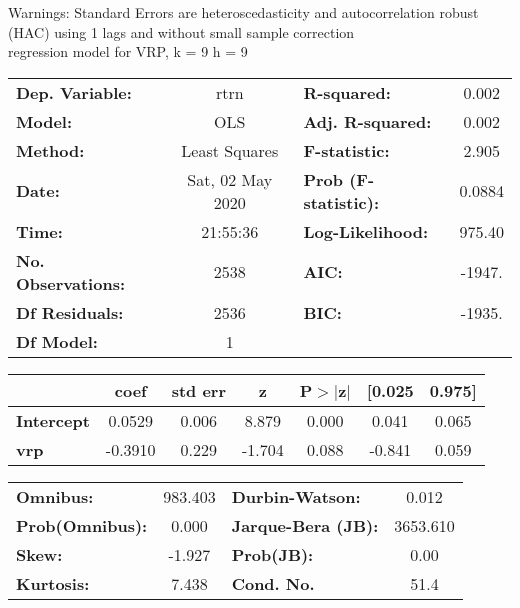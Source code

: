 Warnings: \newline
 [1] Standard Errors are heteroscedasticity and autocorrelation robust (HAC) using 1 lags and without small sample correction\\ 

regression model for VRP, k = 9 h = 9\begin{center}
\begin{tabular}{lclc}
\toprule
\textbf{Dep. Variable:}    &       rtrn       & \textbf{  R-squared:         } &     0.002   \\
\textbf{Model:}            &       OLS        & \textbf{  Adj. R-squared:    } &     0.002   \\
\textbf{Method:}           &  Least Squares   & \textbf{  F-statistic:       } &     2.905   \\
\textbf{Date:}             & Sat, 02 May 2020 & \textbf{  Prob (F-statistic):} &   0.0884    \\
\textbf{Time:}             &     21:55:36     & \textbf{  Log-Likelihood:    } &    975.40   \\
\textbf{No. Observations:} &        2538      & \textbf{  AIC:               } &    -1947.   \\
\textbf{Df Residuals:}     &        2536      & \textbf{  BIC:               } &    -1935.   \\
\textbf{Df Model:}         &           1      & \textbf{                     } &             \\
\bottomrule
\end{tabular}
\begin{tabular}{lcccccc}
                   & \textbf{coef} & \textbf{std err} & \textbf{z} & \textbf{P$> |$z$|$} & \textbf{[0.025} & \textbf{0.975]}  \\
\midrule
\textbf{Intercept} &       0.0529  &        0.006     &     8.879  &         0.000        &        0.041    &        0.065     \\
\textbf{vrp}       &      -0.3910  &        0.229     &    -1.704  &         0.088        &       -0.841    &        0.059     \\
\bottomrule
\end{tabular}
\begin{tabular}{lclc}
\textbf{Omnibus:}       & 983.403 & \textbf{  Durbin-Watson:     } &    0.012  \\
\textbf{Prob(Omnibus):} &   0.000 & \textbf{  Jarque-Bera (JB):  } & 3653.610  \\
\textbf{Skew:}          &  -1.927 & \textbf{  Prob(JB):          } &     0.00  \\
\textbf{Kurtosis:}      &   7.438 & \textbf{  Cond. No.          } &     51.4  \\
\bottomrule
\end{tabular}
\end{center}

